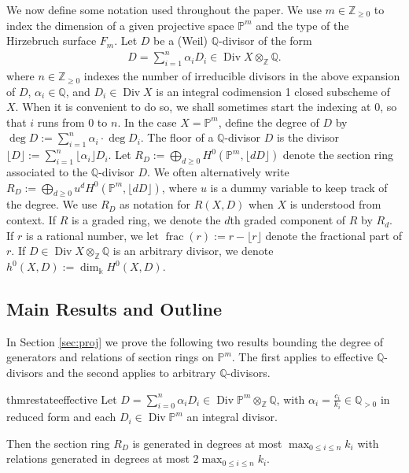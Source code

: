 \documentclass{amsart}
\theoremstyle{plain}
\theoremstyle{definition}
\theoremstyle{remark}
\numberwithin{equation}{section}
\newcommand\ssec{\subsection}
\newcommand\bq{{\mathbb Q}}
\newcommand\bp{{\mathbb P}}
\newcommand\bz{{\mathbb Z}}
\newcommand\bk{{\Bbbk}}
\DeclareMathOperator\di{Div}
\newcommand\hirz{F}
\DeclareMathOperator{\fr}{frac}
\begin{document}
We now define some notation used throughout the paper.
We use $m \in \bz_{\geq 0}$ to index the dimension of a given projective
space $\bp^m$ and the type of the Hirzebruch surface $\hirz_m$.
Let $D$ be a (Weil) $\bq$-divisor of the form
\begin{align*}
	D = \sum_{i=1}^{n}\alpha_i D_i \in \di X \otimes_\bz \bq.
\end{align*}\noindent
where $n \in \bz_{\geq 0}$ indexes the number of irreducible divisors in 
the above expansion of $D$, $\alpha_i \in \bq$, and $D_i \in \di X$ is an integral
codimension 1 closed subscheme of $X$. When it is convenient to do
so, we shall sometimes start the indexing at $0$, so that $i$ runs
from $0$ to $n$. In the case $X = \bp^m$, define the degree of $D$ by $\deg D :=
\sum_{i=1}^{n}\alpha_i \cdot \deg D_i$. The floor of a $\bq$-divisor $D$ is the divisor
$\lfloor D \rfloor := \sum_{i = 1}^{n}
\lfloor \alpha_i \rfloor D_i$. Let 
$R_D := \bigoplus_{d \geq 0} H^0(\bp^m, \lfloor dD \rfloor)$
denote the section ring associated to the $\bq$-divisor $D$. 
We often alternatively write
$R_D := \bigoplus_{d \geq 0} u^d H^0(\bp^m, \lfloor dD \rfloor)$, where $u$ is a dummy
variable to keep track of the degree.
We use $R_D$ as notation for $R(X,D)$ when $X$ is understood from context.
If $R$
is a graded ring, we denote the $d$th graded component of $R$ by $R_d$. If $r$ is a rational number, we let
$\fr(r) := r - \lfloor r
\rfloor$ denote the fractional part of $r$. 
If $D \in \di X \otimes_\bz \bq$
is an arbitrary divisor, we denote $h^0(X, D) := \dim_\bk H^0(X,D)$.


\ssec{Main Results and Outline}
\label{ssec:main}

In Section \ref{sec:proj} we prove the following two results bounding
the degree of generators and relations of
section rings on $\bp^m$. The first applies
to effective $\bq$-divisors and the second applies to arbitrary
$\bq$-divisors.

\begin{restatable}{thm}{restateeffective}
\label{thm:proj-effective-intro}
Let $D = \sum_{i = 0}^{n} \alpha_i D_i \in \di \bp^m \otimes_\bz \bq$, with $\alpha_i =
\frac{c_i}{k_i} \in \bq_{> 0}$ in reduced form and each $D_i \in \di \bp^m$ an integral divisor.

Then the section ring $R_D$
is generated in degrees at most $\max_{0 \leq i \leq n}{k_i}$ with
relations generated in degrees at most $2 \max_{0 \leq i \leq n}{k_i}$.
\end{restatable}
\end{document}
